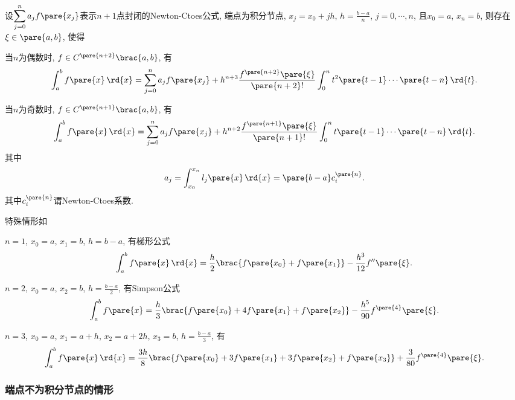 \documentclass[hidelinks]{ctexart}
\begin{document}
\begin{theorem}
    设$\displaystyle \sum_{j=0}^n a_j f\pare{x_j}$表示$n+1$点封闭的Newton-Ctoes公式, 端点为积分节点, $\displaystyle x_j = x_0 + jh$, $\displaystyle h = \frac{b-a}{n}$, $j=0,\cdots,n$, 且$x_0 = a$, $x_n = b$, 则存在$\xi \in \pare{a,b}$, 使得
    \begin{cenum}
        \item 当$n$为偶数时, $f\in C^{\pare{n+2}}\brac{a,b}$, 有
        \[ \int_a^b f\pare{x}\,\rd{x} = \sum_{j=0}^n a_jf\pare{x_j} + h^{n+3} \frac{f^{\pare{n+2}}\pare{\xi}}{\pare{n+2}!} \int_0^n t^2\pare{t-1}\cdots \pare{t-n}\,\rd{t}. \]
        \item 当$n$为奇数时, $f\in C^{\pare{n+1}}\brac{a,b}$, 有
        \[ \int_a^b f\pare{x}\,\rd{x} = \sum_{j=0}^n a_jf\pare{x_j} + h^{n+2}\frac{f^{\pare{n+1}}\pare{\xi}}{\pare{n+1}!}\int_0^n t\pare{t-1}\cdots\pare{t-n}\,\rd{t}. \]
        其中
        \[ a_j = \int_{x_0}^{x_n}l_j\pare{x}\,\rd{x} = \pare{b-a}c_i^{\pare{n}}. \]
        其中$c_i^{\pare{n}}$谓Newton-Ctoes系数.
    \end{cenum}
\end{theorem}
特殊情形如
\begin{cenum}
    \item $n=1$, $x_0 = a$, $x_1 = b$, $h = b-a$, 有梯形公式
    \[ \int_a^b f\pare{x}\,\rd{x} = \frac{h}{2}\brac{f\pare{x_0} + f\pare{x_1}} - \frac{h^3}{12}f''\pare{\xi}. \]
    \item $n=2$, $x_0 = a$, $x_2 = b$, $\displaystyle h = \frac{b-a}{2}$, 有Simpson公式
    \[ \int_a^b f\pare{x} = \frac{h}{3}\brac{f\pare{x_0} + 4f\pare{x_1} + f\pare{x_2}} - \frac{h^5}{90}f^{\pare{4}}\pare{\xi}. \]
    \item $n=3$, $x_0 = a$, $x_1 = a+h$, $x_2 = a+2h$, $x_3 = b$, $\displaystyle h = \frac{b-a}{3}$, 有
    \[ \int_a^b f\pare{x}\,\rd{x} = \frac{3h}{8}\brac{f\pare{x_0} + 3f\pare{x_1} + 3f\pare{x_2} + f\pare{x_3}} + \frac{3}{80}f^{\pare{4}}\pare{\xi}. \]
\end{cenum}


\subsubsection{端点不为积分节点的情形} %
\label{ssub:端点不为积分节点的情形}
\end{document}
